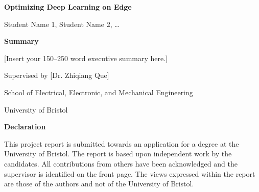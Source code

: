 \documentclass[11pt,a4paper]{article}
\newcommand{\projecttitle}{Optimizing Deep Learning on Edge}
\newcommand{\studentnames}{Student Name 1, Student Name 2, \ldots}
\newcommand{\supervisorname}{[Dr. Zhiqiang Que]}
\newcommand{\reportyear}{\the\year}         %
\begin{document}
\begin{center}
  {\LARGE\bfseries\projecttitle}

  \vspace{0.6cm}

  {\large\studentnames}
\end{center}

\vspace{0.6cm}

{\large\bfseries Summary}\par
\medskip
\noindent
[Insert your 150--250 word executive summary here.]

\vspace{1.2cm}

\begin{center}
  Supervised by \supervisorname

  \vspace{0.4cm}
  School of Electrical, Electronic, and Mechanical Engineering

  \vspace{0.2cm}
  University of Bristol

  \vspace{0.2cm}
  \reportyear
\end{center}

\clearpage

\begin{center}
  {\Large\bfseries Declaration}
\end{center}

\medskip
\noindent
This project report is submitted towards an application for a degree at the University of Bristol. The report is based upon independent work by the candidates. All contributions from others have been acknowledged and the supervisor is identified on the front page. The views expressed within the report are those of the authors and not of the University of Bristol.
\end{document}
